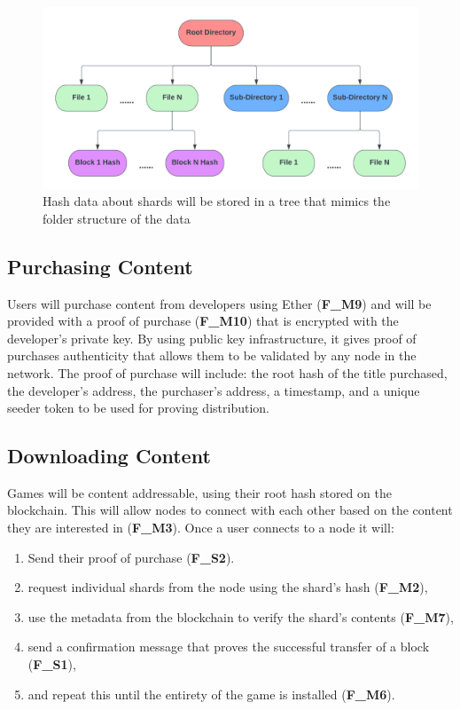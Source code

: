 \begin{figure}[ht]
  \centering
  \includegraphics[width=.85\textwidth]{assets/images/diagrams/block-body.png}
  \caption{Hash data about shards will be stored in a tree that mimics the folder structure of the data}
  \label{fig:hash-storage}
\end{figure}

\subsection*{Purchasing Content}

Users will purchase content from developers using Ether (\textbf{F\_M9}) and will be provided with a proof of purchase (\textbf{F\_M10}) that is encrypted with the developer's private key. By using public key infrastructure, it gives proof of purchases authenticity that allows them to be validated by any node in the network.
\x
The proof of purchase will include: the root hash of the title purchased, the developer's address, the purchaser's address, a timestamp, and a unique seeder token to be used for proving distribution.

\subsection*{Downloading Content}

Games will be content addressable, using their root hash stored on the blockchain. This will allow nodes to connect with each other based on the content they are interested in (\textbf{F\_M3}). Once a user connects to a node it will:
\vspace{2mm}
\begin{enumerate}
  \item Send their proof of purchase (\textbf{F\_S2}).
  \item request individual shards from the node using the shard's hash (\textbf{F\_M2}),
  \item use the metadata from the blockchain to verify the shard's contents (\textbf{F\_M7}),
  \item send a confirmation message that proves the successful transfer of a block (\textbf{F\_S1}), 
  \item and repeat this until the entirety of the game is installed (\textbf{F\_M6}).
\end{enumerate}

